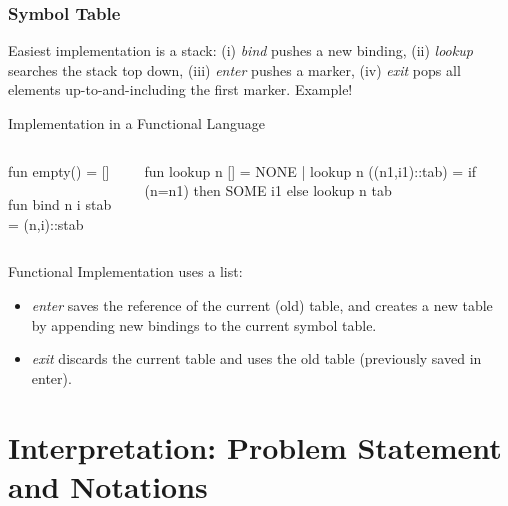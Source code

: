 \documentclass{beamer}
\renewcommand{\emph}[1]{\textcolor{structure}{#1}}
\newcommand{\emp}[1]{\textcolor{DikuRed}{ #1}}
\begin{document}
\begin{frame}[fragile,t]
   \frametitle{Symbol Table}

\emp{Easiest implementation is a stack:} (i) \emph{\em bind} pushes a new binding, 
(ii) \emph{\em lookup} searches the stack top down, 
(iii) \emph{\em enter} pushes a marker,
(iv) \emph{\em exit} pops all elements up-to-and-including the first marker. 
\alert{Example!}

\begin{block}{Implementation in a Functional Language }
\begin{columns}
\begin{colorcode}[fontsize=\scriptsize]
fun empty() = []

fun bind n i stab = (n,i)::stab
\end{colorcode} 
\begin{colorcode}[fontsize=\scriptsize]
fun lookup n []      = NONE
  | lookup n ((n1,i1)::tab) =
      if  (n=n1) then SOME i1
      else lookup n tab 
\end{colorcode}
\end{columns}
\end{block}

Functional Implementation uses a list:
\begin{itemize}
    \item \emph{\em enter} saves the reference of the current (old)
        table, and creates a new table by appending new bindings to 
        the current symbol table.
    \item \emph{\em exit} discards the current table and uses the old table 
            (previously saved in enter).
\end{itemize}

\end{frame}

\section{Interpretation: Problem Statement and Notations}

\begin{frame}[fragile]
	\tableofcontents[currentsection]
\end{frame}
\end{document}
